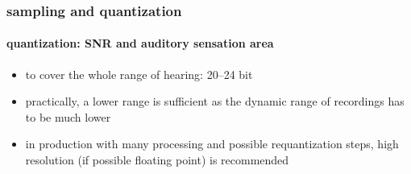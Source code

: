 	\begin{frame}\frametitle{sampling and quantization}\framesubtitle{quantization: SNR and auditory sensation area}
        \begin{itemize}
            \item<3->   to cover the whole range of hearing: 20--24 bit
            \item<3->   practically, a lower range is sufficient as the dynamic range of recordings has to be much lower
            \item<3->   in production with many processing and possible requantization steps, high resolution (if possible floating point) is recommended
        \end{itemize}
	\end{frame}

